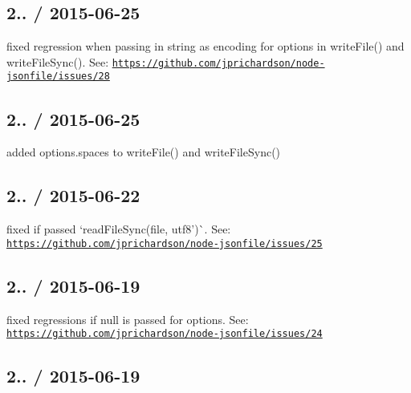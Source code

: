 \subsection*{2.. / 2015-\/06-\/25 }


\begin{DoxyItemize}
\item fixed regression when passing in string as encoding for options in {\ttfamily write\+File()} and {\ttfamily write\+File\+Sync()}. See\+: \href{https://github.com/jprichardson/node-jsonfile/issues/28}{\tt https\+://github.\+com/jprichardson/node-\/jsonfile/issues/28}
\end{DoxyItemize}

\subsection*{2.. / 2015-\/06-\/25 }


\begin{DoxyItemize}
\item added {\ttfamily options.\+spaces} to {\ttfamily write\+File()} and {\ttfamily write\+File\+Sync()}
\end{DoxyItemize}

\subsection*{2.. / 2015-\/06-\/22 }


\begin{DoxyItemize}
\item fixed if passed `read\+File\+Sync(file, \textquotesingle{}utf8')\`{}. See\+: \href{https://github.com/jprichardson/node-jsonfile/issues/25}{\tt https\+://github.\+com/jprichardson/node-\/jsonfile/issues/25}
\end{DoxyItemize}

\subsection*{2.. / 2015-\/06-\/19 }


\begin{DoxyItemize}
\item fixed regressions if {\ttfamily null} is passed for options. See\+: \href{https://github.com/jprichardson/node-jsonfile/issues/24}{\tt https\+://github.\+com/jprichardson/node-\/jsonfile/issues/24}
\end{DoxyItemize}

\subsection*{2.. / 2015-\/06-\/19 }



